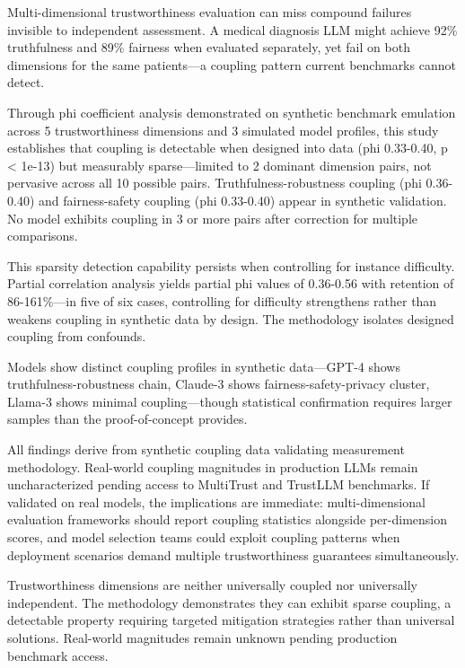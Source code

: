 
Multi-dimensional trustworthiness evaluation can miss compound failures invisible to independent assessment. A medical diagnosis LLM might achieve 92\% truthfulness and 89\% fairness when evaluated separately, yet fail on both dimensions for the same patients---a coupling pattern current benchmarks cannot detect.

Through phi coefficient analysis demonstrated on synthetic benchmark emulation across 5 trustworthiness dimensions and 3 simulated model profiles, this study establishes that coupling is detectable when designed into data (phi 0.33-0.40, p < 1e-13) but measurably sparse---limited to 2 dominant dimension pairs, not pervasive across all 10 possible pairs. Truthfulness-robustness coupling (phi 0.36-0.40) and fairness-safety coupling (phi 0.33-0.40) appear in synthetic validation. No model exhibits coupling in 3 or more pairs after correction for multiple comparisons.

This sparsity detection capability persists when controlling for instance difficulty. Partial correlation analysis yields partial phi values of 0.36-0.56 with retention of 86-161\%---in five of six cases, controlling for difficulty strengthens rather than weakens coupling in synthetic data by design. The methodology isolates designed coupling from confounds.

Models show distinct coupling profiles in synthetic data---GPT-4 shows truthfulness-robustness chain, Claude-3 shows fairness-safety-privacy cluster, Llama-3 shows minimal coupling---though statistical confirmation requires larger samples than the proof-of-concept provides.

All findings derive from synthetic coupling data validating measurement methodology. Real-world coupling magnitudes in production LLMs remain uncharacterized pending access to MultiTrust and TrustLLM benchmarks. If validated on real models, the implications are immediate: multi-dimensional evaluation frameworks should report coupling statistics alongside per-dimension scores, and model selection teams could exploit coupling patterns when deployment scenarios demand multiple trustworthiness guarantees simultaneously.

Trustworthiness dimensions are neither universally coupled nor universally independent. The methodology demonstrates they can exhibit sparse coupling, a detectable property requiring targeted mitigation strategies rather than universal solutions. Real-world magnitudes remain unknown pending production benchmark access.
